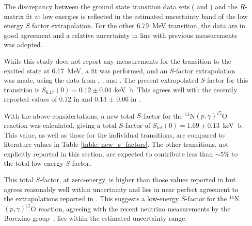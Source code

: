 The discrepancy between the ground state transition data sets (\citet{Imbriani2005} and \citet{Runkle2005}) and the $R$-matrix fit at low energies is reflected in the estimated uncertainty band of the low energy $S$ factor extrapolation. For the other 6.79~MeV transition, the data are in good agreement and a relative uncertainty in line with previous measurements was adopted. 

While this study does not report any measurements for the transition to the excited state at 6.17~MeV, a fit was performed, and an $S$-factor extrapolation was made, using the data from \citet{Schroder1987}, \citet{Runkle2005}, and \citet{Imbriani2005}. The present extrapolated $S$-factor for this transition is $S_{6.17}(0) = 0.12 \pm 0.04$~keV~b. This agrees well with the recently reported values of 0.12 in \citet{Azuma2010} and 0.13 $\pm$ 0.06 in \citet{Adelberger2011}.

With the above considertations, a new total $S$-factor for the $^{14}$N$(p,\gamma)^{15}$O reaction was calculated, giving a total $S$-factor of $S_{tot}(0) = 1.69 \pm 0.13$~keV~b. This value, as well as those for the individual transitions, are compared to literature values in Table \ref{table: new_s_factors}. The other transitions, not explicitly reported in this section, are expected to contribute less than $\sim5\%$ to the total low energy $S$-factor. 

This total $S$-factor, at zero-energy, is higher than those values reported in \cite{Imbriani2005, Marta2008, Adelberger2011} but agrees reasonably well within uncertainty and lies in near perfect agreement to the extrapolations reported in \cite{Runkle2005, Angulo2005}. This suggests a low-energy $S$-factor for the $^{14}$N$(p,\gamma)^{15}$O reaction, agreeing with the recent neutrino measurements by the Borexino group~\citet{agostini2020direct}, lies within the estimated uncertainty range. 



